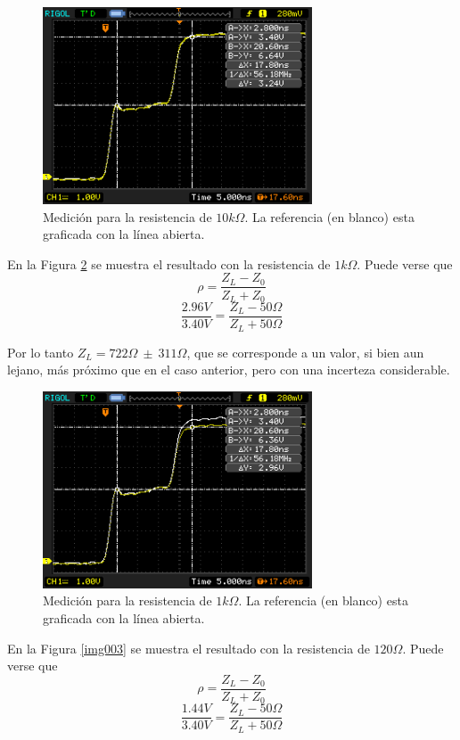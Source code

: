 \documentclass[a4paper,10pt]{article}
\begin{document}
		\begin{figure}[!htb]
			\centering
			\includegraphics[width=8cm]
			{Imagenes/Res10k.png}
			\caption{Medici\'on para la resistencia de $10k\Omega$. La 
			referencia (en blanco) esta graficada con la l\'inea abierta.}
			\label{img001} 
		\end{figure}

	\indent En la Figura \ref{img002} se muestra el resultado con la 
	resistencia de $1k\Omega$. Puede verse que 
	$$\rho=\frac{Z_L-Z_0}{Z_L+Z_0}$$
	$$\frac{2.96V}{3.40V}=\frac{Z_L- 50\Omega}{Z_L+50\Omega}$$
	
	\indent Por lo tanto $Z_L=722\Omega~\pm~311\Omega$, que se corresponde a un valor, si 
	bien aun lejano, m\'as pr\'oximo que en el caso anterior, pero con una incerteza considerable.
		
		\begin{figure}[!htb]
			\centering
			\includegraphics[width=8cm]
			{Imagenes/Res1k.png}
			\caption{Medici\'on para la resistencia de $1k\Omega$. La 
			referencia (en blanco) esta graficada con la l\'inea abierta.}
			\label{img002} 
		\end{figure}

	\indent En la Figura \ref{img003} se muestra el resultado con la 
	resistencia de $120\Omega$. Puede verse que 
	$$\rho=\frac{Z_L-Z_0}{Z_L+Z_0}$$
	$$\frac{1.44V}{3.40V}=\frac{Z_L- 50\Omega}{Z_L+50\Omega}$$
	
\end{document}
